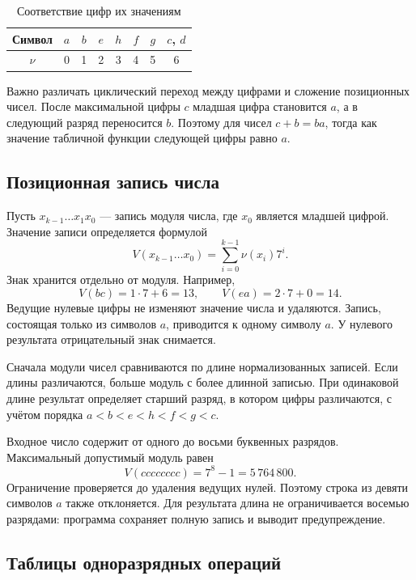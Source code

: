 \documentclass[14pt,a4paper]{extarticle}
\begin{document}
\begin{table}[H]
\caption{Соответствие цифр их значениям}\label{tab:digits}
\centering
\begin{tabular}{|c|c|c|c|c|c|c|c|}\hline
Символ & $a$ & $b$ & $e$ & $h$ & $f$ & $g$ & $c$, $d$\\\hline
$\nu$ & 0 & 1 & 2 & 3 & 4 & 5 & 6\\\hline
\end{tabular}
\end{table}

Важно различать циклический переход между цифрами и сложение позиционных чисел. После максимальной цифры $c$ младшая цифра становится $a$, а в следующий разряд переносится $b$. Поэтому для чисел $c+b=ba$, тогда как значение табличной функции следующей цифры равно $a$.

\subsection{Позиционная запись числа}

Пусть $x_{k-1}\ldots x_1x_0$ --- запись модуля числа, где $x_0$ является младшей цифрой. Значение записи определяется формулой
\[
V(x_{k-1}\ldots x_0)=\sum_{i=0}^{k-1}\nu(x_i)7^i.
\]
Знак хранится отдельно от модуля. Например,
\[
V(bc)=1\cdot7+6=13,\qquad V(ea)=2\cdot7+0=14.
\]
Ведущие нулевые цифры не изменяют значение числа и удаляются. Запись, состоящая только из символов $a$, приводится к одному символу $a$. У нулевого результата отрицательный знак снимается.

Сначала модули чисел сравниваются по длине нормализованных записей. Если длины различаются, больше модуль с более длинной записью. При одинаковой длине результат определяет старший разряд, в котором цифры различаются, с учётом порядка $a<b<e<h<f<g<c$.

Входное число содержит от одного до восьми буквенных разрядов. Максимальный допустимый модуль равен
\[
V(cccccccc)=7^8-1=5\,764\,800.
\]
Ограничение проверяется до удаления ведущих нулей. Поэтому строка из девяти символов $a$ также отклоняется. Для результата длина не ограничивается восемью разрядами: программа сохраняет полную запись и выводит предупреждение.

\subsection{Таблицы одноразрядных операций}
\end{document}
